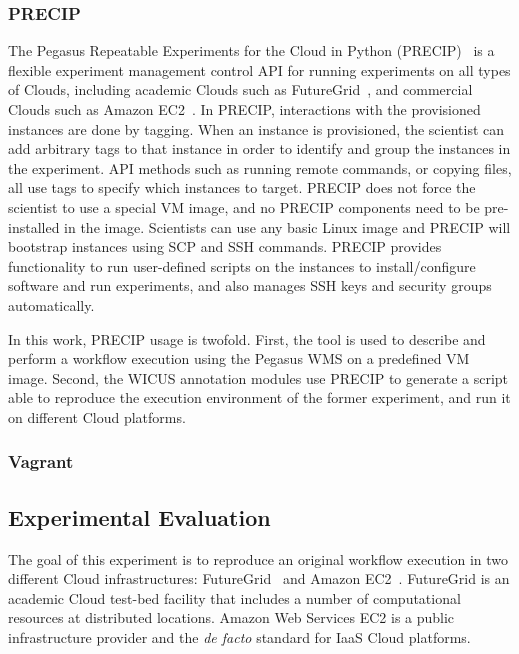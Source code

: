 \documentclass[final,5p,times,twocolumn]{elsarticle}
\newcommand{\note}[2][inline]{\todo[color=yellow!30,#1]{\small\sf #2}}
\begin{document}
\subsubsection{PRECIP}
The Pegasus Repeatable Experiments for the Cloud in Python (PRECIP)~\cite{Azarnoosh-CRC-2013} is a flexible experiment management control API for running experiments on all types of Clouds, including academic Clouds such as FutureGrid~\cite{futuregrid}, and commercial Clouds such as Amazon EC2~\cite{aws}. In PRECIP, interactions with the provisioned instances are done by tagging. When an instance is provisioned, the scientist can add arbitrary tags to that instance in order to identify and group the instances in the experiment. API methods such as running remote commands, or copying files, all use tags to specify which instances to target. PRECIP does not force the scientist to use a special VM image, and no PRECIP components need to be pre-installed in the image. Scientists can use any basic Linux image and PRECIP will bootstrap instances using SCP and SSH commands. PRECIP provides functionality to run user-defined scripts on the instances to install/configure software and run experiments, and also manages SSH keys and security groups automatically.

In this work, PRECIP usage is twofold. First, the tool is used to describe and perform a workflow execution using the Pegasus WMS on a predefined VM image. Second, the WICUS annotation modules use PRECIP to generate a script able to reproduce the execution environment of the former experiment, and run it on different Cloud platforms.


\subsubsection{Vagrant}

\note{Idafen to add some text about Vagrant.}



\subsection{Experimental Evaluation}

The goal of this experiment is to reproduce an original workflow execution in two different Cloud infrastructures: FutureGrid~\cite{futuregrid} and Amazon EC2~\cite{aws}. FutureGrid is an academic Cloud test-bed facility that includes a number of computational resources at distributed locations. Amazon Web Services EC2 is a public infrastructure provider and the \emph{de facto} standard for IaaS Cloud platforms.
\end{document}

